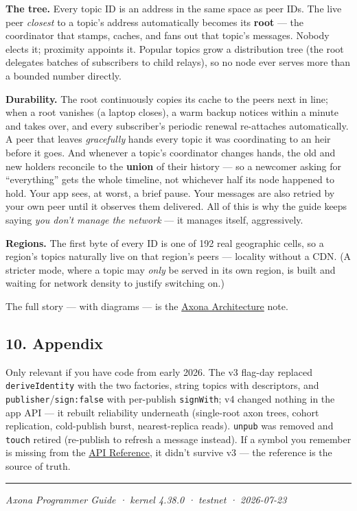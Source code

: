 \documentclass[
  nobib]{tufte-handout}
\renewcommand{\subsubsection}[1]{\medskip\par\noindent{\normalsize\bfseries #1}\par\nobreak\smallskip}
\begin{document}
\textbf{The tree.} Every topic ID is an address in the same space as
peer IDs. The live peer \emph{closest} to a topic's address
automatically becomes its \textbf{root} --- the coordinator that stamps,
caches, and fans out that topic's messages. Nobody elects it; proximity
appoints it. Popular topics grow a distribution tree (the root delegates
batches of subscribers to child relays), so no node ever serves more
than a bounded number directly.

\textbf{Durability.} The root continuously copies its cache to the peers
next in line; when a root vanishes (a laptop closes), a warm backup
notices within a minute and takes over, and every subscriber's periodic
renewal re-attaches automatically. A peer that leaves \emph{gracefully}
hands every topic it was coordinating to an heir before it goes. And
whenever a topic's coordinator changes hands, the old and new holders
reconcile to the \textbf{union} of their history --- so a newcomer
asking for ``everything'' gets the whole timeline, not whichever half
its node happened to hold. Your app sees, at worst, a brief pause. Your
messages are also retried by your own peer until it observes them
delivered. All of this is why the guide keeps saying \emph{you don't
manage the network} --- it manages itself, aggressively.

\textbf{Regions.} The first byte of every ID is one of 192 real
geographic cells, so a region's topics naturally live on that region's
peers --- locality without a CDN. (A stricter mode, where a topic may
\emph{only} be served in its own region, is built and waiting for
network density to justify switching on.)

The full story --- with diagrams --- is the
\href{../architecture/Axona-Architecture.tex}{Axona Architecture} note.

\subsection{10. Appendix}\label{appendix}

\subsubsection{Migrating from the v2/v3
lines}\label{migrating-from-the-v2v3-lines}

Only relevant if you have code from early 2026. The v3 flag-day replaced
\texttt{deriveIdentity} with the two factories, string topics with
descriptors, and \texttt{publisher}/\texttt{sign:false} with per-publish
\texttt{signWith}; v4 changed nothing in the app API --- it rebuilt
reliability underneath (single-root axon trees, cohort replication,
cold-publish burst, nearest-replica reads). \texttt{unpub} was removed
and \texttt{touch} retired (re-publish to refresh a message instead). If
a symbol you remember is missing from the
\href{Axona-API-Reference-v4.38.0.md}{API Reference}, it didn't survive
v3 --- the reference is the source of truth.

\begin{center}\rule{0.5\linewidth}{0.5pt}\end{center}

\emph{Axona Programmer Guide · kernel 4.38.0 · testnet · 2026-07-23}
\end{document}
